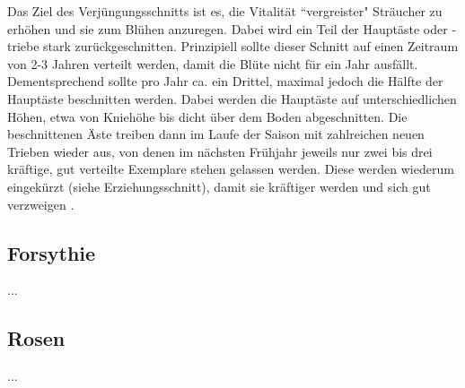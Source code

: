 Das Ziel des Verjüngungsschnitts ist es, die Vitalität ``vergreister" Sträucher zu erhöhen und sie zum Blühen anzuregen. 
Dabei wird ein Teil der Hauptäste oder -triebe stark zurückgeschnitten.
Prinzipiell sollte dieser Schnitt auf einen Zeitraum von 2-3 Jahren verteilt werden, damit die Blüte nicht für ein Jahr ausfällt.
Dementsprechend sollte pro Jahr ca. ein Drittel, maximal jedoch die Hälfte der Hauptäste beschnitten werden.
Dabei werden die Hauptäste auf unterschiedlichen Höhen, etwa von Kniehöhe bis dicht über dem Boden abgeschnitten.
Die beschnittenen Äste treiben dann im Laufe der Saison mit zahlreichen neuen Trieben wieder aus, von denen im nächsten Frühjahr jeweils nur zwei bis drei kräftige, gut verteilte Exemplare stehen gelassen werden.
Diese werden wiederum eingekürzt (siehe Erziehungsschnitt), damit sie kräftiger werden und sich gut verzweigen \cite{Siemens2021}. 

\subsection{Forsythie}

...

\subsection{Rosen}

...


\pagebreak